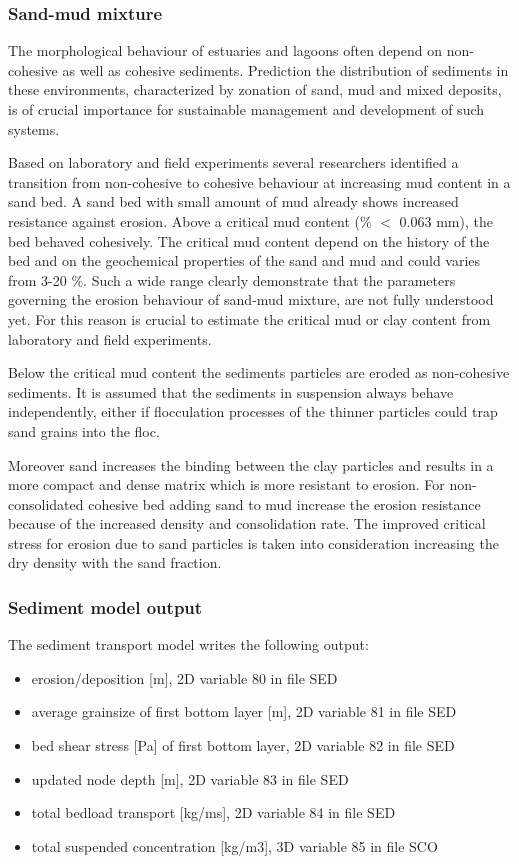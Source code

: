 \subsubsection{Sand-mud mixture}
The morphological behaviour of estuaries and lagoons often depend on
non-cohesive as well as cohesive sediments. Prediction the distribution
of sediments in these environments, characterized by zonation of sand,
mud and mixed deposits, is of crucial importance for sustainable
management and development of such systems.

Based on laboratory and field experiments several researchers identified a
transition from non-cohesive to cohesive behaviour at increasing mud content
in a sand bed. A sand bed with small amount of mud already shows increased
resistance against erosion. Above a critical mud content (\% $<$ 0.063 mm), 
the bed behaved cohesively. The critical mud content depend on the history 
of the bed and on the geochemical properties of the sand and mud and could 
varies from 3-20 \%. Such a wide range clearly demonstrate that the 
parameters governing the erosion behaviour of sand-mud mixture, are
 not fully understood yet. For this reason is crucial to estimate 
the critical mud or clay content from laboratory and field experiments.

Below the critical mud content the sediments particles are eroded as
non-cohesive sediments. It is assumed that the sediments in suspension
always behave independently, either if flocculation processes of the
thinner particles could trap sand grains into the floc.

Moreover sand increases the binding between the clay particles and results
in a more compact and dense matrix which is more resistant to erosion. For
non-consolidated cohesive bed adding sand to mud increase the erosion
resistance because of the increased density and consolidation rate.
The improved critical stress for erosion due to sand particles is taken
into consideration increasing the dry density with the sand fraction.

\subsubsection{Sediment model output}
The sediment transport model writes the following output:
\begin{itemize}
\item erosion/deposition [m], 2D variable 80 in file SED
\item average grainsize of first bottom layer [m], 2D variable 81 in file SED 
\item bed shear stress [Pa] of first bottom layer, 2D variable 82 in file SED
\item updated node depth [m], 2D variable 83 in file SED
\item total bedload transport [kg/ms], 2D variable 84 in file SED
\item total suspended concentration [kg/m3], 3D variable 85 in file SCO
\end{itemize}

